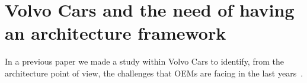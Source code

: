 \section{Volvo Cars and the need of having an architecture framework}\label{sec:lessonsLearned}

In a previous paper we made a study within Volvo Cars to identify, from the architecture point of view, the challenges that OEMs are facing in the last years~\cite{WICSA2015}.


